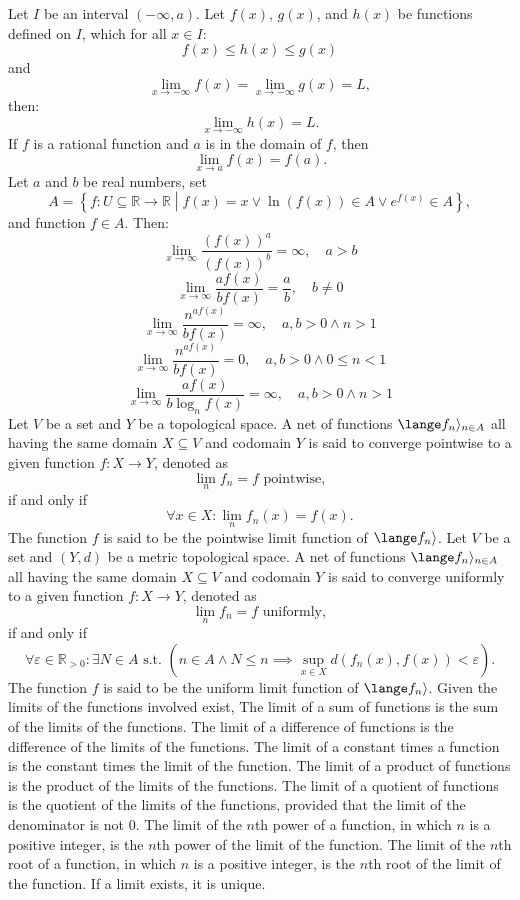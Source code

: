 \documentclass[a4paper,12pt]{report}
\begin{document}
Let \(I\) be an interval $(-\infty,a)$. Let $f(x)$, $g(x)$, and $h(x)$ be functions defined on \(I\), which for all $x\in I$:
\[f(x)\leq h(x)\leq g(x)\]
and
\[\lim_{x\to-\infty}f(x)=\lim_{x\to-\infty}g(x)=L,\]
then: 
\[\lim_{x\to-\infty}h(x)=L.\]
If $f$ is a rational function and $a$ is in the domain of $f$, then
\[\lim_{x\to a}f(x)=f(a).\]
Let \( a \) and \( b \) be real numbers, set
\[A=\left\{f\colon U\subseteq\mathbb{R}\to\mathbb{R} \middle | f(x) = x \lor \ln(f(x)) \in A \lor e^{f\left(x\right)}  \in A \right\},\]
and function $f\in A$. Then:
\[\lim_{x \to \infty} \frac{\left(f\left(x\right)\right)^a}{\left(f\left(x\right)\right)^b} = \infty, \quad a > b \]
\[ \lim_{x \to \infty} \frac{af\left(x\right)}{bf\left(x\right)} = \frac{a}{b}, \quad b \neq 0 \]
\[ \lim_{x \to \infty}\frac{n^{af\left(x\right)}}{bf\left(x\right)} = \infty, \quad a,b > 0 \land  n > 1 \]
\[ \lim_{x \to \infty}\frac{n^{af\left(x\right)}}{bf\left(x\right)} = 0, \quad a,b > 0 \land  0\leq n<1 \]
\[ \lim_{x \to \infty}\frac{af\left(x\right)}{b\log_n f\left(x\right)} = \infty, \quad a,b > 0 \land  n > 1 \]
Let $V$ be a set and $Y$ be a topological space. A net of functions $\lange f_n\rangle_{n\in A}$ all having the same domain $X\subseteq V$ and codomain $Y$ is said to converge pointwise to a given function $f\colon X\to Y$, denoted as 
\[\lim_nf_n=f\text{\ pointwise},\]
if and only if
\[\forall x\in X\colon\lim_nf_n(x)=f(x).\]
The function $f$ is said to be the pointwise limit function of $\lange f_n\rangle$.
Let $V$ be a set and $(Y,d)$ be a metric topological space. A net of functions $\lange f_n\rangle_{n\in A}$ all having the same domain $X\subseteq V$ and codomain $Y$ is said to converge uniformly to a given function $f\colon X\to Y$, denoted as 
\[\lim_nf_n=f\text{\ uniformly},\]
if and only if
\[\forall\varepsilon\in\mathbb{R}_{>0}\colon\exists N\in A\text{\ s.t.\ }\left(n\in A\land N\leq n\implies\sup_{x\in X}d(f_n(x),f(x))<\varepsilon\right).\]
The function $f$ is said to be the uniform limit function of $\lange f_n\rangle$.
Given the limits of the functions involved exist,
The limit of a sum of functions is the sum of the limits of the functions.
The limit of a difference of functions is the difference of the limits of the functions.
The limit of a constant times a function is the constant times the limit of the function.
The limit of a product of functions is the product of the limits of the functions.
The limit of a quotient of functions is the quotient of the limits of the functions, provided that the limit of the denominator is not 0.
The limit of the $n$th power of a function, in which $n$ is a positive integer, is the $n$th power of the limit of the function.
The limit of the $n$th root of a function, in which $n$ is a positive integer, is the $n$th root of the limit of the function.
If a limit exists, it is unique.
\end{document}
